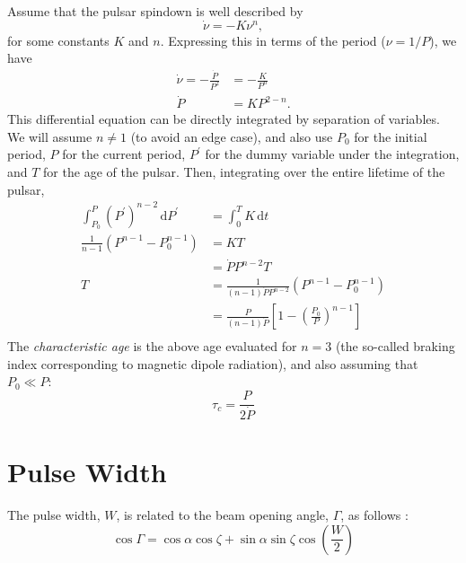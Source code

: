 \documentclass{book}
\begin{document}
\citep[This same derivation is given briefly in][\S3.2.2.]{Lorimer2005}
Assume that the pulsar spindown is well described by
\begin{equation}
    \dot{\nu} = -K\nu^n,
\end{equation}
for some constants $K$ and $n$.
Expressing this in terms of the period ($\nu = 1/P$), we have
\begin{equation}
    \begin{aligned}
        \dot{\nu} = -\frac{\dot{P}}{P^2}
            &= -\frac{K}{P^n} \\
        \dot{P} &= KP^{2-n}.
    \end{aligned}
\end{equation}
This differential equation can be directly integrated by separation of variables.
We will assume $n \ne 1$ (to avoid an edge case), and also use $P_0$ for the initial period, $P$ for the current period, $P^\prime$ for the dummy variable under the integration, and $T$ for the age of the pulsar.
Then, integrating over the entire lifetime of the pulsar,
\begin{equation}
    \begin{aligned}
        \int_{P_0}^{P} (P^\prime)^{n-2}\,\text{d}P^\prime
            &= \int_0^T K\,\text{d}t \\
        \frac{1}{n-1}\left(P^{n-1} - P_0^{n-1}\right)
            &= KT \\
            &= \dot{P} P^{n-2} T \\
        T   &= \frac{1}{(n-1)\dot{P}P^{n-2}}\left(P^{n-1} - P_0^{n-1}\right) \\
            &= \frac{P}{(n-1)\dot{P}}\left[1 - \left(\frac{P_0}{P}\right)^{n-1}\right] \\
    \end{aligned}
\end{equation}
The \emph{characteristic age} is the above age evaluated for $n = 3$ (the so-called braking index corresponding to magnetic dipole radiation), and also assuming that $P_0 \ll P$:
\begin{equation}
    \tau_c = \frac{P}{2\dot{P}}
\end{equation}

\section{Pulse Width}

The pulse width, $W$, is related to the beam opening angle, $\Gamma$, as follows \citep{Lorimer2005}:
\begin{equation}
    \cos\Gamma = \cos\alpha\cos\zeta + \sin\alpha\sin\zeta\cos\left(\frac{W}{2}\right)
    \tag{H3.27}
\end{equation}
\end{document}
